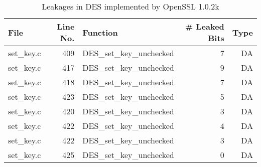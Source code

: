 \begin{table}[h!]
\centering\tiny\scriptsize
\caption{Leakages in DES implemented by OpenSSL 1.0.2k}\label{tab:DESOpenSSL1.0.2k}
\begin{tabular}{lrlrr}
\hline
\textbf{File} & \textbf{Line No.} & \textbf{Function} & \textbf{\# Leaked Bits} & \textbf{Type} \\\hline
set\_key.c& 409&DES\_set\_key\_unchecked&7 &DA\\
set\_key.c& 417&DES\_set\_key\_unchecked&9 &DA\\
set\_key.c& 418&DES\_set\_key\_unchecked&7 &DA\\
set\_key.c& 423&DES\_set\_key\_unchecked&5 &DA\\
set\_key.c& 420&DES\_set\_key\_unchecked&3 &DA\\
set\_key.c& 422&DES\_set\_key\_unchecked&4 &DA\\
set\_key.c& 422&DES\_set\_key\_unchecked&3 &DA\\
set\_key.c& 425&DES\_set\_key\_unchecked&0 &DA\\
\hline
\end{tabular}
\renewcommand{\baselinestretch}{1.0}\selectfont
\end{table}
